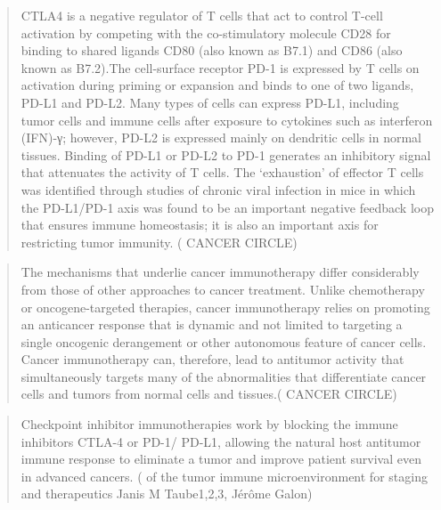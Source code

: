 \documentclass[12pt,]{book}
\theoremstyle{definition}
\theoremstyle{definition}
\theoremstyle{definition}
\theoremstyle{remark}
\begin{document}
\begin{quote}
CTLA4 is a negative regulator of T cells that act to control T-cell
activation by competing with the co-stimulatory molecule CD28 for
binding to shared ligands CD80 (also known as B7.1) and CD86 (also known
as B7.2).The cell-surface receptor PD-1 is expressed by T cells on
activation during priming or expansion and binds to one of two ligands,
PD-L1 and PD-L2. Many types of cells can express PD-L1, including tumor
cells and immune cells after exposure to cytokines such as interferon
(IFN)-γ; however, PD-L2 is expressed mainly on dendritic cells in normal
tissues. Binding of PD-L1 or PD-L2 to PD-1 generates an inhibitory
signal that attenuates the activity of T cells. The `exhaustion' of
effector T cells was identified through studies of chronic viral
infection in mice in which the PD-L1/PD-1 axis was found to be an
important negative feedback loop that ensures immune homeostasis; it is
also an important axis for restricting tumor immunity. (\citet{IMMUNE}
CANCER CIRCLE)
\end{quote}

\begin{quote}
The mechanisms that underlie cancer immunotherapy differ considerably
from those of other approaches to cancer treatment. Unlike chemotherapy
or oncogene-targeted therapies, cancer immunotherapy relies on promoting
an anticancer response that is dynamic and not limited to targeting a
single oncogenic derangement or other autonomous feature of cancer
cells. Cancer immunotherapy can, therefore, lead to antitumor activity
that simultaneously targets many of the abnormalities that differentiate
cancer cells and tumors from normal cells and tissues.(\citet{IMMUNE}
CANCER CIRCLE)
\end{quote}

\begin{quote}
Checkpoint inhibitor immunotherapies work by blocking the immune
inhibitors CTLA-4 or PD-1/ PD-L1, allowing the natural host antitumor
immune response to eliminate a tumor and improve patient survival even
in advanced cancers. (\citet{Implications} of the tumor immune
microenvironment for staging and therapeutics Janis M Taube1,2,3, Jérôme
Galon)
\end{quote}
\end{document}
